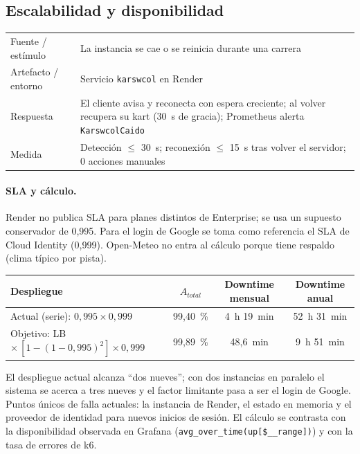 \documentclass[11pt,a4paper]{article}
\begin{document}
\subsection{Escalabilidad y disponibilidad}
\begin{tabularx}{\textwidth}{lL}
\toprule
Fuente / estímulo & La instancia se cae o se reinicia durante una carrera\\
Artefacto / entorno & Servicio \texttt{karswcol} en Render\\
Respuesta & El cliente avisa y reconecta con espera creciente; al volver recupera su kart (30~s de gracia); Prometheus alerta \texttt{KarswcolCaido}\\
Medida & Detección $\le$ 30~s; reconexión $\le$ 15~s tras volver el servidor; 0 acciones manuales\\
\bottomrule
\end{tabularx}

\paragraph{SLA y cálculo.} Render no publica SLA para planes distintos de
Enterprise; se usa un supuesto conservador de 0{,}995. Para el login de
Google se toma como referencia el SLA de Cloud Identity (0{,}999). Open-Meteo
no entra al cálculo porque tiene respaldo (clima típico por pista).

\begin{center}
\begin{tabular}{lccc}
\toprule
Despliegue & $A_{total}$ & Downtime mensual & Downtime anual\\\midrule
Actual (serie): $0{,}995 \times 0{,}999$ & 99{,}40~\% & 4~h 19~min & 52~h 31~min\\
Objetivo: LB $\times\,[1-(1-0{,}995)^2] \times 0{,}999$ & 99{,}89~\% & 48{,}6~min & 9~h 51~min\\
\bottomrule
\end{tabular}
\end{center}
El despliegue actual alcanza ``dos nueves''; con dos instancias en paralelo
el sistema se acerca a tres nueves y el factor limitante pasa a ser el login
de Google. Puntos únicos de falla actuales: la instancia de Render, el estado
en memoria y el proveedor de identidad para nuevos inicios de sesión. El
cálculo se contrasta con la disponibilidad observada en Grafana
(\texttt{avg\_over\_time(up[\$\_\_range])}) y con la tasa de errores de k6.
\end{document}
